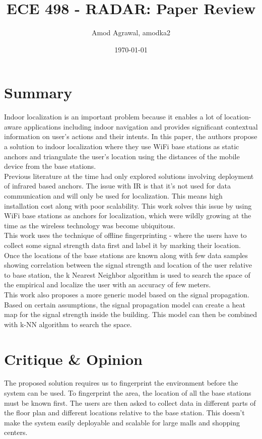 \documentclass[a4paper]{article}
\title{ECE 498 - RADAR: Paper Review}
\author{Amod Agrawal, amodka2}
\date{\today}
\begin{document}
\maketitle
\section{Summary}
Indoor localization is an important problem because it enables a lot of location-aware applications including indoor navigation and provides significant contextual information on user's actions and their intents. In this paper, the authors propose a solution to indoor localization where they use WiFi base stations as static anchors and triangulate the user's location using the distances of the mobile device from the base stations.\\

Previous literature at the time had only explored solutions involving deployment of infrared based anchors. The issue with IR is that it's not used for data communication and will only be used for localization. This means high installation cost along with poor scalability. This work solves this issue by using WiFi base stations as anchors for localization, which were wildly growing at the time as the wireless technology was become ubiquitous.\\

This work uses the technique of offline fingerprinting - where the users have to collect some signal strength data first and label it by marking their location. Once the locations of the base stations are known along with few data samples showing correlation between the signal strength and location of the user relative to base station, the k Nearest Neighbor algorithm is used to search the space of the empirical and localize the user with an accuracy of few meters.\\

This work also proposes a more generic model based on the signal propagation. Based on certain assumptions, the signal propagation model can create a heat map for the signal strength inside the building. This model can then be combined with k-NN algorithm to search the space. \\

\section{Critique \& Opinion}

The proposed solution requires us to fingerprint the environment before the system can be used. To fingerprint the area, the location of all the base stations must be known first. The users are then asked to collect data in different parts of the floor plan and different locations relative to the base station. This doesn't make the system easily deployable and scalable for large malls and shopping centers.\\
\end{document}
